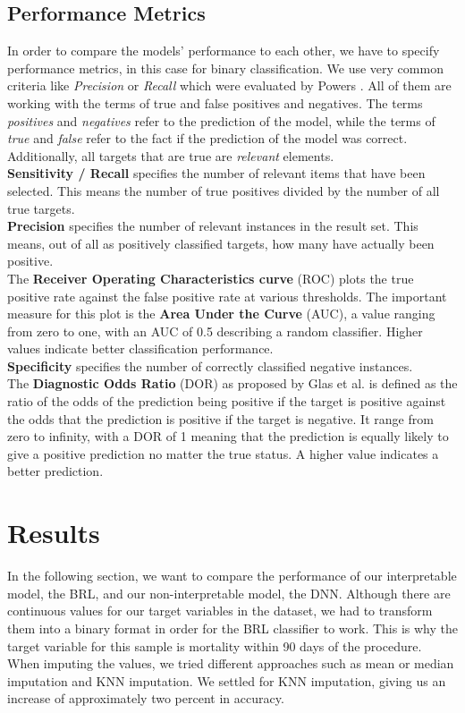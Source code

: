 \documentclass[conference,comsoc]{IEEEtran}
\begin{document}
\subsection{Performance Metrics}
In order to compare the models' performance to each other, we have to specify performance metrics, in this case for binary classification.
We use very common criteria like \emph{Precision} or \emph{Recall} which were evaluated by Powers \cite{powers2011evaluation}.
All of them are working with the terms of true and false positives and negatives.
The terms \emph{positives} and \emph{negatives} refer to the prediction of the model, while the terms of \emph{true} and \emph{false} refer to the fact if the prediction of the model was correct.
Additionally, all targets that are true are \emph{relevant} elements. \\
\textbf{Sensitivity / Recall} specifies the number of relevant items that have been selected.
This means the number of true positives divided by the number of all true targets. \\
\textbf{Precision} specifies the number of relevant instances in the result set.
This means, out of all as positively classified targets, how many have actually been positive. \\
The \textbf{Receiver Operating Characteristics curve} (ROC) plots the true positive rate against the false positive rate at various thresholds.
The important measure for this plot is the \textbf{Area Under the Curve} (AUC), a value ranging from zero to one, with an AUC of 0.5 describing a random classifier.
Higher values indicate better classification performance. \\
\textbf{Specificity} specifies the number of correctly classified negative instances. \\
The \textbf{Diagnostic Odds Ratio} (DOR) as proposed by Glas et al.\cite{glas2003diagnostic} is defined as the ratio of the odds of the prediction being positive if the target is positive against the odds that the prediction is positive if the target is negative.
It range from zero to infinity, with a DOR of 1 meaning that the prediction is equally likely to give a positive prediction no matter the true status.
A higher value indicates a better prediction.


\section{Results}
\label{sec:results}
In the following section, we want to compare the performance of our interpretable model, the BRL, and our non-interpretable model, the DNN.
Although there are continuous values for our target variables in the dataset, we had to transform them into a binary format in order for the BRL classifier to work.
This is why the target variable for this sample is mortality within 90 days of the procedure. \\
When imputing the values, we tried different approaches such as mean or median imputation and KNN imputation.
We settled for KNN imputation, giving us an increase of approximately two percent in accuracy. \\
\end{document}
